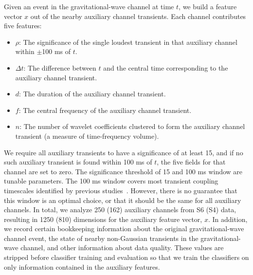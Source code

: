 \documentclass[prd, twocolumn, lengthcheck, superscriptaddress, showpacs, letterpaper, nofootinbib]{revtex4-1}
\newcommand\auxvec{x}
\begin{document}
Given an event in the gravitational-wave channel at time $t$, we build a feature vector $\auxvec$ out of the nearby auxiliary channel transients.
Each channel contributes five features:
\begin{itemize}
	\item $\rho$: The significance of the single loudest transient in that auxiliary channel within 
              $\pm$100 ms of $t$.
	\item $\Delta t$: The difference between $t$ and the central time corresponding to the auxiliary channel transient.
	\item $d$: The duration of the auxiliary channel transient.
	\item $f$: The central frequency of the auxiliary channel transient.
	\item $n$: The number of wavelet coefficients clustered to form the auxiliary channel 
              transient (a measure of time-frequency volume).
\end{itemize}
We require all auxiliary transients to have a significance of at least 15, and if no such auxiliary transient is found within 100 ms of $t$, the five fields for that channel are set to zero. The significance threshold of 15 and 100 ms window are tunable parameters. The 100 ms window covers most transient coupling timescales identified by previous studies~\cite{Smith:2011an}. 
However, there is no guarantee that this window is an optimal choice, or that it should be the same for all auxiliary channels. 
In total, we analyze 250 (162) auxiliary channels from S6 (S4) data, resulting in 1250 (810) dimensions for the auxiliary feature vector, $\auxvec$. In addition, we record certain bookkeeping information about the original gravitational-wave channel event, the state of nearby non-Gaussian transients in the gravitational-wave channel, and other information about data quality.  
These values are stripped before classifier training and evaluation so that we train the classifiers on only information contained in the auxiliary features.
\end{document}
